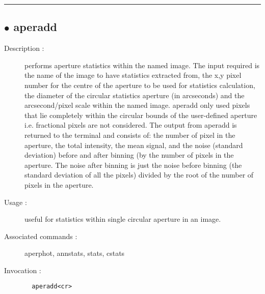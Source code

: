 \hrule \subsection*{$\bullet$ aperadd}
\begin{description}
\item[Description :] performs aperture statistics within the named image. The input
required is the name of the image to have statistics extracted from, the
x,y pixel number for the centre of the aperture to be used for statistics
calculation, the diameter of the circular statistics aperture (in
arcseconds) and the arcsecond/pixel scale within the named image. aperadd
only used pixels that lie completely within the circular bounds of the
user-defined aperture i.e. fractional pixels are not considered. The
output from aperadd is returned to the terminal and consists of: the
number of pixel in the aperture, the total intensity, the mean signal,
and the noise (standard deviation) before and after binning (by the
number of pixels in the aperture.  The noise after binning is just the
noise before binning (the standard deviation of all the pixels) divided
by the root of the number of pixels in the aperture.
\item[Usage :] useful for statistics within single circular aperture in an image.
\item[Associated commands :] aperphot, annstats, stats, cstats
\item[Invocation :]

\verb+  aperadd<cr> +\end{description}

